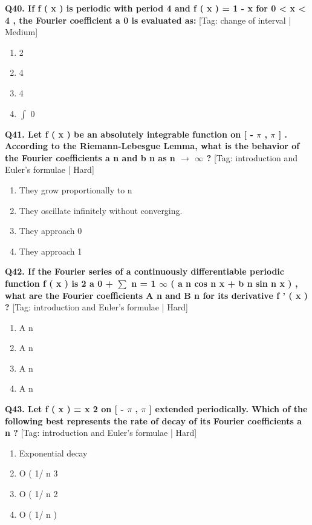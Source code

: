 \noindent\textbf{Q40. If f ( x ) is periodic with period 4 and f ( x ) = 1 - x for 0 < x < 4 , the Fourier coefficient a 0 is evaluated as:} \hfill [Tag: change of interval | Medium]
\begin{enumerate}[label=(\alph*),topsep=2pt,itemsep=1pt,partopsep=0pt,parsep=0pt]
    \item {{2}}
    \item {{4}}
    \item {{4}}
    \item {{$\int$ 0}}
\end{enumerate}
\vspace{2mm}

\noindent\textbf{Q41. Let f ( x ) be an absolutely integrable function on [ - $\pi$ , $\pi$ ] . According to the Riemann-Lebesgue Lemma, what is the behavior of the Fourier coefficients a n and b n as n $\to$ $\infty$ ?} \hfill [Tag: introduction and Euler's formulae | Hard]
\begin{enumerate}[label=(\alph*),topsep=2pt,itemsep=1pt,partopsep=0pt,parsep=0pt]
    \item {{They grow proportionally to n}}
    \item {{They oscillate infinitely without converging.}}
    \item {{They approach 0}}
    \item {{They approach 1}}
\end{enumerate}
\vspace{2mm}

\noindent\textbf{Q42. If the Fourier series of a continuously differentiable periodic function f ( x ) is 2 a 0 + $\sum$ n = 1 $\infty$ ( a n cos n x + b n sin n x ) , what are the Fourier coefficients A n and B n for its derivative f ' ( x ) ?} \hfill [Tag: introduction and Euler's formulae | Hard]
\begin{enumerate}[label=(\alph*),topsep=2pt,itemsep=1pt,partopsep=0pt,parsep=0pt]
    \item {{A n}}
    \item {{A n}}
    \item {{A n}}
    \item {{A n}}
\end{enumerate}
\vspace{2mm}

\noindent\textbf{Q43. Let f ( x ) = x 2 on [ - $\pi$ , $\pi$ ] extended periodically. Which of the following best represents the rate of decay of its Fourier coefficients a n ?} \hfill [Tag: introduction and Euler's formulae | Hard]
\begin{enumerate}[label=(\alph*),topsep=2pt,itemsep=1pt,partopsep=0pt,parsep=0pt]
    \item {{Exponential decay}}
    \item {{O ( 1/ n 3}}
    \item {{O ( 1/ n 2}}
    \item {{O ( 1/ n )}}
\end{enumerate}
\vspace{2mm}

